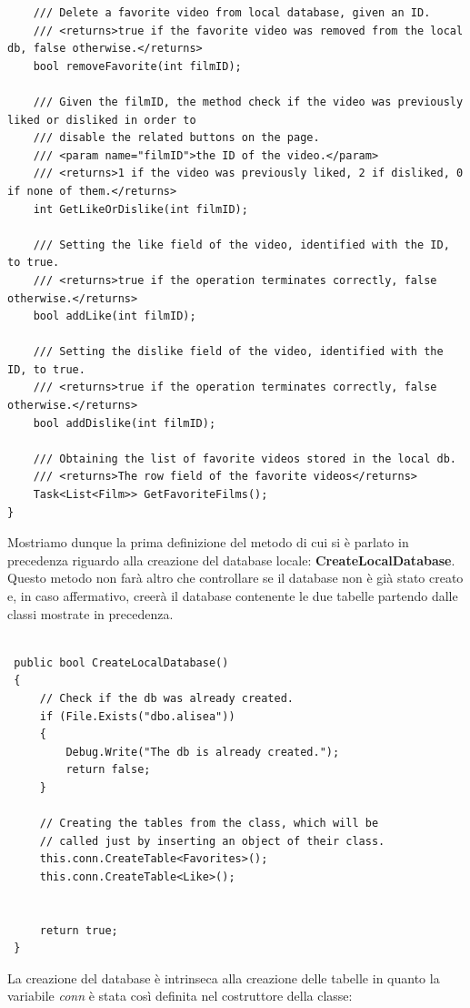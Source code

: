 \documentclass[a4]{book}
\begin{document}
\begin{lstlisting}
	/// Delete a favorite video from local database, given an ID.
	/// <returns>true if the favorite video was removed from the local db, false otherwise.</returns>
	bool removeFavorite(int filmID);
	
	/// Given the filmID, the method check if the video was previously liked or disliked in order to
	/// disable the related buttons on the page.
	/// <param name="filmID">the ID of the video.</param>
	/// <returns>1 if the video was previously liked, 2 if disliked, 0 if none of them.</returns>
	int GetLikeOrDislike(int filmID);
	
	/// Setting the like field of the video, identified with the ID, to true.
	/// <returns>true if the operation terminates correctly, false otherwise.</returns>
	bool addLike(int filmID);
	
	/// Setting the dislike field of the video, identified with the ID, to true.
	/// <returns>true if the operation terminates correctly, false otherwise.</returns>
	bool addDislike(int filmID);
	
	/// Obtaining the list of favorite videos stored in the local db.
	/// <returns>The row field of the favorite videos</returns>
	Task<List<Film>> GetFavoriteFilms();
}
\end{lstlisting}

Mostriamo dunque la prima definizione del metodo di cui si è parlato in precedenza riguardo alla creazione del database locale: \textbf{CreateLocalDatabase}. Questo metodo non farà altro che controllare se il database non è già stato creato e, in caso affermativo, creerà il database contenente le due tabelle partendo dalle classi mostrate in precedenza.

\begin{lstlisting}

 public bool CreateLocalDatabase()
 {
	 // Check if the db was already created.
	 if (File.Exists("dbo.alisea"))
	 {
		 Debug.Write("The db is already created.");
		 return false;
	 }
	 
	 // Creating the tables from the class, which will be 
	 // called just by inserting an object of their class.
	 this.conn.CreateTable<Favorites>();
	 this.conn.CreateTable<Like>();
	 
	 
	 return true;
 }
\end{lstlisting}

 La creazione del database è intrinseca alla creazione delle tabelle in quanto la variabile \textit{conn} è stata così definita nel costruttore della classe:
 
\end{document}
